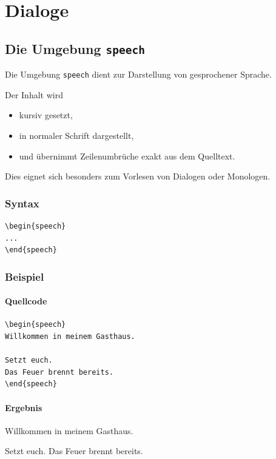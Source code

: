 \section{Dialoge}

\subsection{Die Umgebung \texttt{speech}}

Die Umgebung \verb|speech| dient zur Darstellung von gesprochener Sprache.

Der Inhalt wird

\begin{itemize}
\item kursiv gesetzt,
\item in normaler Schrift dargestellt,
\item und übernimmt Zeilenumbrüche exakt aus dem Quelltext.
\end{itemize}

Dies eignet sich besonders zum Vorlesen von Dialogen oder Monologen.

\subsubsection*{Syntax}

\begin{Verbatim}
\begin{speech}
...
\end{speech}
\end{Verbatim}

\subsubsection*{Beispiel}

\paragraph{Quellcode}

\begin{Verbatim}
\begin{speech}
Willkommen in meinem Gasthaus.

Setzt euch.
Das Feuer brennt bereits.
\end{speech}
\end{Verbatim}

\paragraph{Ergebnis}

\begin{speech}
Willkommen in meinem Gasthaus.

Setzt euch.
Das Feuer brennt bereits.
\end{speech}
